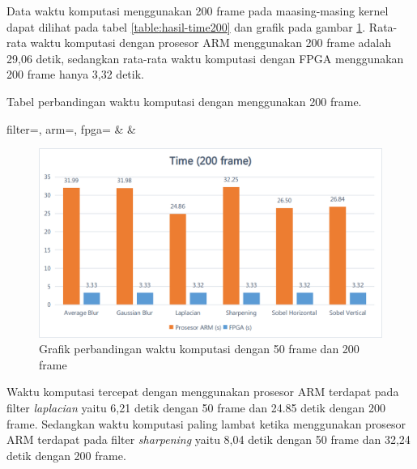
Data waktu komputasi menggunakan 200 frame pada maasing-masing kernel dapat dilihat pada tabel \ref{table:hasil-time200} dan grafik pada gambar \ref{fig:chart-time200}. Rata-rata waktu komputasi dengan prosesor ARM menggunakan 200 frame adalah 29,06 detik, sedangkan rata-rata waktu komputasi dengan FPGA menggunakan 200 frame hanya 3,32 detik.
\begin{atable}
    \caption{Tabel perbandingan waktu komputasi dengan menggunakan 200 frame.}
    \label{table:hasil-time200}
        {
            filter=\filter, 
            arm=\arm, 
            fpga=\fpga}
        {
            \filter & 
            \arm & 
            \fpga }
\end{atable}

\begin{figure}[ht]
    \centering
    \includegraphics[width=0.81\linewidth, center]{images/chart/chart-time200.png}
    \caption{Grafik perbandingan waktu komputasi dengan 50 frame dan 200 frame}
    \label{fig:chart-time200}
\end{figure}

Waktu komputasi tercepat dengan menggunakan prosesor ARM terdapat pada filter \textit{laplacian} yaitu 6,21 detik dengan 50 frame dan 24.85 detik dengan 200 frame. Sedangkan waktu komputasi paling lambat ketika menggunakan prosesor ARM terdapat pada filter \textit{sharpening} yaitu 8,04 detik dengan 50 frame dan 32,24 detik dengan 200 frame. 


